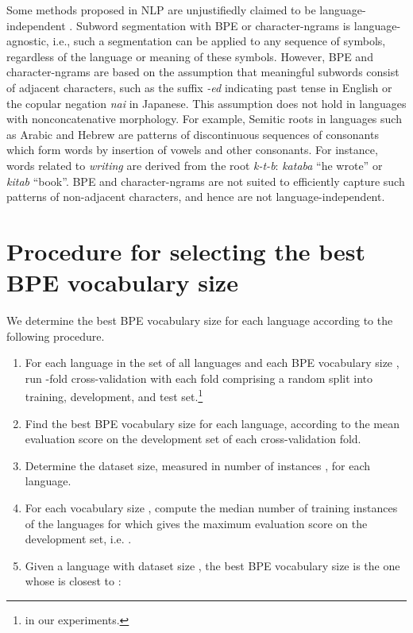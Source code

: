 \documentclass[11pt,a4paper]{article}
\begin{document}
Some methods proposed in NLP are unjustifiedly claimed to be language-independent \citep{bender2011independence}.
Subword segmentation with BPE or character-ngrams is language-agnostic, i.e., such a segmentation can be applied to any sequence of symbols, regardless of the language or meaning of these symbols.
However, BPE and character-ngrams are based on the assumption that meaningful subwords consist of adjacent characters, such as the suffix \emph{-ed} indicating past tense in English or the copular negation \emph{nai} in Japanese.
This assumption does not hold in languages with nonconcatenative morphology.
For example, Semitic roots in languages such as Arabic and Hebrew are patterns of discontinuous sequences of consonants which form words by insertion of vowels and other consonants. 
For instance, words related to \emph{writing} are derived from the root \emph{k-t-b}: \emph{kataba} ``he wrote'' or \emph{kitab} ``book''.
BPE and character-ngrams are not suited to efficiently capture such patterns of non-adjacent characters, and hence are not language-independent.

\section{Procedure for selecting the best BPE vocabulary size}
\label{sec:best-vocab-size}

We determine the best BPE vocabulary size for each language according to the following procedure.
\begin{enumerate}
	\item For each language  in the set of all languages  and each BPE vocabulary size , run -fold cross-validation with each fold comprising a random split into training, development, and test set.\footnote{ in our experiments.}
	\item Find the best BPE vocabulary size  for each language, according to the mean evaluation score on the development set of each cross-validation fold.
	\item Determine the dataset size, measured in number of instances , for each language.
	\item For each vocabulary size , compute the median number of training instances of the languages for which  gives the maximum evaluation score on the development set, i.e. .
	\item Given a language with dataset size , the best BPE vocabulary size  is the one whose  is closest to : 
\end{enumerate}
\end{document}
